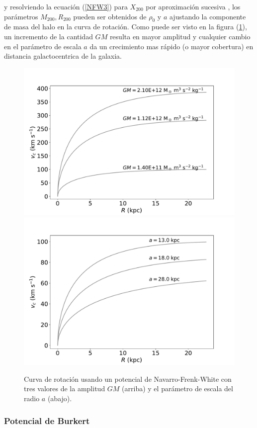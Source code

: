 y resolviendo la ecuación (\ref{NFW3}) para $X_{200}$ por aproximación sucesiva \cite{S16}, los parámetros $M_{200}, R_{200}$ pueden ser obtenidos de $\rho_0$ y $a$ ajustando la componente de masa del halo en la curva de rotación. Como puede ser visto en la figura (\ref{fig:Fig_NFW_parameters}), un incremento de la cantidad $GM$ resulta en mayor amplitud y cualquier cambio en el parámetro de escala $a$ da un crecimiento mas rápido (o mayor cobertura) en distancia galactocentrica de la galaxia.

\begin{figure}
  \centering
    \includegraphics[width=0.8\columnwidth]{Kap2/NFW_Amp.pdf}
    \includegraphics[width=0.8\columnwidth]{Kap2/NFW_a.pdf}
  \caption{ Curva de rotación usando un potencial de Navarro-Frenk-White con tres valores de la amplitud $GM$ (arriba) y el parámetro de escala del radio $a$ (abajo).}
  \label{fig:Fig_NFW_parameters}
\end{figure}

\subsubsection{Potencial de Burkert}


